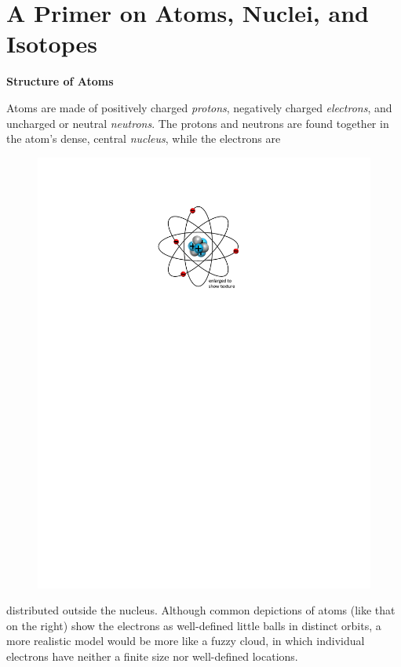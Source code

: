 \section{A Primer on Atoms, Nuclei, and Isotopes}
\label{appendix_nuclear_primer}

{\setlength{\baselineskip}{1.15\baselineskip} \setlength{\parskip}{1.5 \parskip}
\bigskip
\textbf{Structure of Atoms}

Atoms are made of positively charged \textit{protons}, negatively charged \textit{electrons}, and uncharged or neutral \textit{neutrons}.  The protons and neutrons are found together in the atom's dense, central \textit{nucleus}, while the 
electrons are 
\begin{figure}
\begin{center}
\vspace{-0.2in}
\includegraphics[scale=0.85]{appendices/atom_figure.pdf}
\end{center}
\end{figure}
distributed outside the nucleus.  Although common depictions of atoms (like that on the right) show the electrons as well-defined little balls in distinct orbits, a more realistic model would be more like a fuzzy cloud, in which individual electrons have neither a finite size nor well-defined locations.

}
